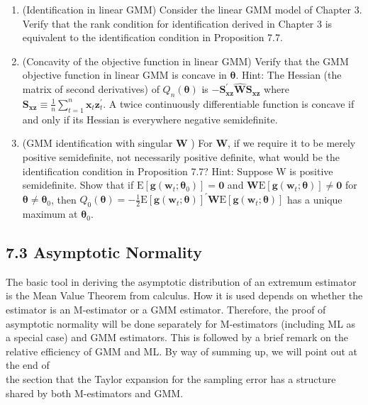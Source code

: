 \documentclass[10pt]{article}
\begin{document}
\begin{enumerate}
  \item (Identification in linear GMM) Consider the linear GMM model of Chapter 3. Verify that the rank condition for identification derived in Chapter 3 is equivalent to the identification condition in Proposition 7.7.
  \item (Concavity of the objective function in linear GMM) Verify that the GMM objective function in linear GMM is concave in $\boldsymbol{\theta}$. Hint: The Hessian (the matrix of second derivatives) of $Q_{n}(\boldsymbol{\theta})$ is $-\mathbf{S}_{\mathbf{x z}}^{\prime} \widehat{\mathbf{W}} \mathbf{S}_{\mathbf{x z}}$ where $\mathbf{S}_{\mathbf{x z}} \equiv \frac{1}{n} \sum_{t=1}^{n} \mathbf{x}_{t} \mathbf{z}_{t}^{\prime}$. A twice continuously differentiable function is concave if and only if its Hessian is everywhere negative semidefinite.
  \item (GMM identification with singular $\mathbf{W}$ ) For $\mathbf{W}$, if we require it to be merely positive semidefinite, not necessarily positive definite, what would be the identification condition in Proposition 7.7? Hint: Suppose W is positive semidefinite. Show that if $\mathrm{E}\left[\mathbf{g}\left(\mathbf{w}_{t} ; \boldsymbol{\theta}_{0}\right)\right]=\mathbf{0}$ and $\mathbf{W} \mathrm{E}\left[\mathbf{g}\left(\mathbf{w}_{t} ; \boldsymbol{\theta}\right)\right] \neq \mathbf{0}$ for $\boldsymbol{\theta} \neq \boldsymbol{\theta}_{0}$, then $Q_{0}(\boldsymbol{\theta})=-\frac{1}{2} \mathrm{E}\left[\mathbf{g}\left(\mathbf{w}_{t} ; \boldsymbol{\theta}\right)\right]^{\prime} \mathbf{W} \mathrm{E}\left[\mathbf{g}\left(\mathbf{w}_{t} ; \boldsymbol{\theta}\right)\right]$ has a unique maximum at $\boldsymbol{\theta}_{0}$.
\end{enumerate}

\subsection*{7.3 Asymptotic Normality}
The basic tool in deriving the asymptotic distribution of an extremum estimator is the Mean Value Theorem from calculus. How it is used depends on whether the estimator is an M-estimator or a GMM estimator. Therefore, the proof of asymptotic normality will be done separately for M-estimators (including ML as a special case) and GMM estimators. This is followed by a brief remark on the relative efficiency of GMM and ML. By way of summing up, we will point out at the end of\\
the section that the Taylor expansion for the sampling error has a structure shared by both M-estimators and GMM.
\end{document}
